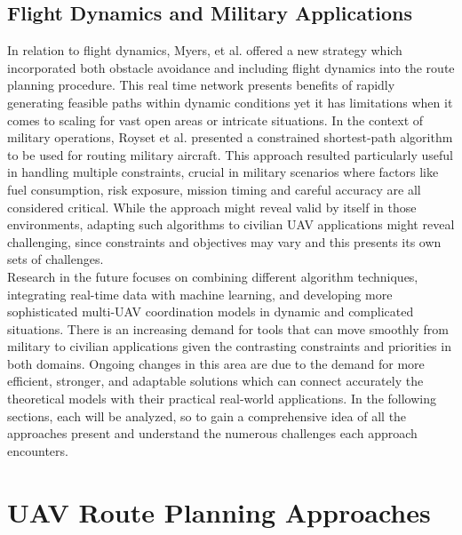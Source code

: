 \documentclass[conference]{IEEEtran}
\begin{document}
\subsection{Flight Dynamics and Military Applications}

In relation to flight dynamics, Myers, et al. \cite{ref1} offered a new strategy which incorporated both obstacle avoidance and including flight dynamics into the route planning procedure. This real time network presents benefits of rapidly generating feasible paths within dynamic conditions yet it has limitations when it comes to scaling for vast open areas or intricate situations.
In the context of military operations, Royset et al. \cite{ref2} presented a constrained shortest-path algorithm to be used for routing military aircraft. This approach resulted particularly useful in handling multiple constraints, crucial in military scenarios where factors like fuel consumption, risk exposure, mission timing and careful accuracy are all considered critical. While the approach might reveal valid by itself in those environments, adapting such algorithms to civilian UAV applications might reveal challenging, since constraints and objectives may vary and this presents its own sets of challenges. \\

Research in the future focuses on combining different algorithm techniques, integrating real-time data with machine learning, and developing more sophisticated multi-UAV coordination models in dynamic and complicated situations. There is an increasing demand for tools that can move smoothly from military to civilian applications given the contrasting constraints and priorities in both domains. Ongoing changes in this area are due to the demand for more efficient, stronger, and adaptable solutions which can connect accurately the theoretical models with their practical real-world applications. In the following sections, each will be analyzed, so to gain a comprehensive idea of all the approaches present and understand the numerous challenges each approach encounters.

\section{UAV Route Planning Approaches}
\end{document}
